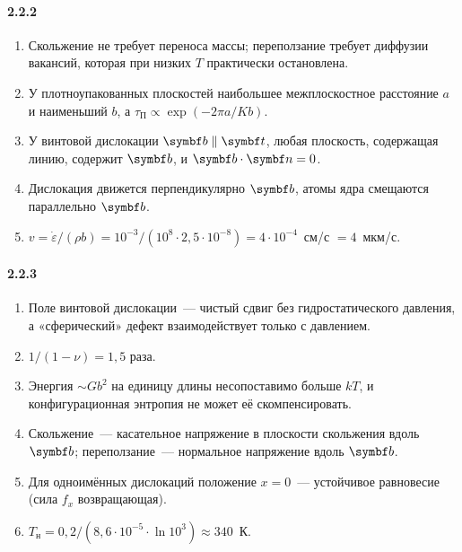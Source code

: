 {\paragraph{2.2.2}
\begin{enumerate}[label=\arabic*.]
\item Скольжение не требует переноса массы; переползание требует
диффузии вакансий, которая при низких $T$ практически остановлена.
\item У плотноупакованных плоскостей наибольшее межплоскостное
расстояние $a$ и наименьший $b$, а $\tau_\text{П}\propto\exp(-2\pi a/Kb)$.
\item У винтовой дислокации $\vb b\parallel\vb t$, любая плоскость,
содержащая линию, содержит $\vb b$, и $\vb b\cdot\vb n=0$.
\item Дислокация движется перпендикулярно $\vb b$, атомы ядра смещаются
параллельно $\vb b$.
\item $v=\dot\varepsilon/(\rho b)=10^{-3}/(10^8\cdot2{,}5\cdot10^{-8})=4\cdot10^{-4}$~см/с
$=4$~мкм/с.
\end{enumerate}

\paragraph{2.2.3}
\begin{enumerate}[label=\arabic*.]
\item Поле винтовой дислокации~— чистый сдвиг без гидростатического
давления, а «сферический» дефект взаимодействует только с давлением.
\item $1/(1-\nu)=1{,}5$ раза.
\item Энергия $\sim Gb^2$ на единицу длины несопоставимо больше $kT$, и
конфигурационная энтропия не может её скомпенсировать.
\item Скольжение~— касательное напряжение в плоскости скольжения вдоль
$\vb b$; переползание~— нормальное напряжение вдоль $\vb b$.
\item Для одноимённых дислокаций положение $x=0$~— устойчивое равновесие
(сила $f_x$ возвращающая).
\item $T_\text{н}=0{,}2/(8{,}6\cdot10^{-5}\cdot\ln10^3)\approx340$~К.
\end{enumerate}

}
